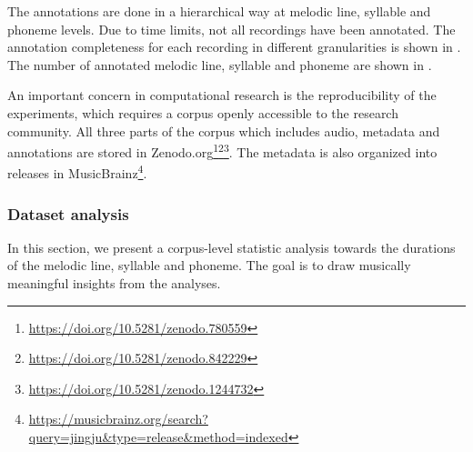 The annotations are done in a hierarchical way at melodic line, syllable and phoneme levels. Due to time limits, not all recordings have been annotated. The annotation completeness for each recording in different granularities is shown in . The number of annotated melodic line, syllable and phoneme are shown in .

An important concern in computational research is the reproducibility of the experiments, which requires a corpus openly accessible to the research community. All three parts of the corpus which includes audio, metadata and annotations are stored in Zenodo.org\footnote{\url{https://doi.org/10.5281/zenodo.780559}}\footnote{\url{https://doi.org/10.5281/zenodo.842229}}\footnote{\url{https://doi.org/10.5281/zenodo.1244732}}. The metadata is also organized into releases in MusicBrainz\footnote{\url{https://musicbrainz.org/search?query=jingju\&type=release\&method=indexed}}.

\subsubsection{Dataset analysis}\label{sec:ch4:dataset_analysis}

In this section, we present a corpus-level statistic analysis towards the durations of the melodic line, syllable and phoneme. The goal is to draw musically meaningful insights from the analyses. 

